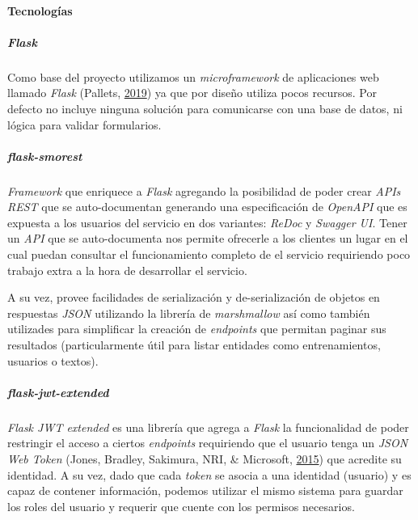 \documentclass[12pt,a4paper,]{scrartcl}
\let\oldparagraph\paragraph
\renewcommand{\paragraph}[1]{\oldparagraph{#1}\mbox{}}
\let\oldsubparagraph\subparagraph
\renewcommand{\subparagraph}[1]{\oldsubparagraph{#1}\mbox{}}
\begin{document}
\hypertarget{tecnologuxedas-1}{%
\paragraph{Tecnologías}\label{tecnologuxedas-1}}

\hypertarget{flask}{%
\subparagraph{\texorpdfstring{\emph{Flask}}{Flask}}\label{flask}}

Como base del proyecto utilizamos un \emph{microframework} de aplicaciones web llamado \emph{Flask} (Pallets, \protect\hyperlink{ref-flask}{2019}) ya que por diseño utiliza pocos recursos. Por defecto no incluye ninguna solución para comunicarse con una base de datos, ni lógica para validar formularios.

\hypertarget{flask-smorest}{%
\subparagraph{\texorpdfstring{\emph{flask-smorest}}{flask-smorest}}\label{flask-smorest}}

\emph{Framework} que enriquece a \emph{Flask} agregando la posibilidad de poder crear \emph{APIs REST} que se auto-documentan generando una especificación de \emph{OpenAPI} que es expuesta a los usuarios del servicio en dos variantes: \emph{ReDoc} y \emph{Swagger UI}. Tener un \emph{API} que se auto-documenta nos permite ofrecerle a los clientes un lugar en el cual puedan consultar el funcionamiento completo de el servicio requiriendo poco trabajo extra a la hora de desarrollar el servicio.

A su vez, provee facilidades de serialización y de-serialización de objetos en respuestas \emph{JSON} utilizando la librería de \emph{marshmallow} así como también utilizades para simplificar la creación de \emph{endpoints} que permitan paginar sus resultados (particularmente útil para listar entidades como entrenamientos, usuarios o textos).

\hypertarget{flask-jwt-extended}{%
\subparagraph{\texorpdfstring{\emph{flask-jwt-extended}}{flask-jwt-extended}}\label{flask-jwt-extended}}

\emph{Flask JWT extended} es una librería que agrega a \emph{Flask} la funcionalidad de poder restringir el acceso a ciertos \emph{endpoints} requiriendo que el usuario tenga un \emph{JSON Web Token} (Jones, Bradley, Sakimura, NRI, \& Microsoft, \protect\hyperlink{ref-JWT}{2015}) que acredite su identidad. A su vez, dado que cada \emph{token} se asocia a una identidad (usuario) y es capaz de contener información, podemos utilizar el mismo sistema para guardar los roles del usuario y requerir que cuente con los permisos necesarios.
\end{document}
